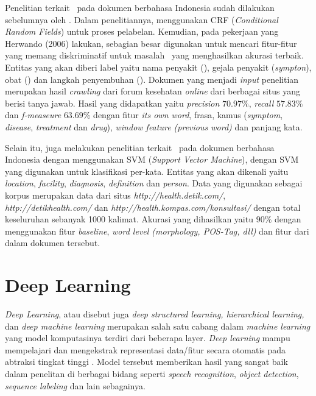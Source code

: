 Penelitian terkait \mer~pada dokumen berbahasa Indonesia sudah dilakukan sebelumnya oleh \cite{skripsiKakRadit}. Dalam penelitiannya, \cite{skripsiKakRadit} menggunakan CRF (\textit{Conditional Random Fields}) untuk proses pelabelan. Kemudian, pada pekerjaan yang Herwando (2006) lakukan, sebagian besar digunakan untuk mencari fitur-fitur yang memang diskriminatif untuk masalah \mer~yang menghasilkan akurasi terbaik. Entitas yang akan diberi label yaitu nama penyakit (\textit{\disease}), gejala penyakit (\textit{sympton}), obat (\textit{\drug}) dan langkah penyembuhan (\textit{\treatment}). Dokumen yang menjadi \textit{input} penelitian merupakan hasil \textit{crawling} dari  forum kesehatan \textit{online} dari berbagai situs yang berisi tanya jawab. Hasil yang didapatkan yaitu \textit{precision} $ 70.97\% $, \textit{recall} $ 57.83\% $ dan \textit{f-measeure} $ 63.69\% $ dengan fitur \textit{its own word}, frasa, kamus (\textit{symptom}, \textit{disease}, \textit{treatment} dan \textit{drug}), \textit{window feature (previous word)} dan panjang kata.

Selain itu, \cite{suwarningsih2014imner} juga melakukan penelitian terkait \mer~pada dokumen berbahasa Indonesia dengan menggunakan SVM (\textit{Support Vector Machine}), dengan SVM yang digunakan untuk klasifikasi per-kata. Entitas yang akan dikenali yaitu \textit{location}, \textit{facility}, \textit{diagnosis}, \textit{definition} dan \textit{person}. Data yang digunakan sebagai korpus merupakan data dari situs \textit{http://health.detik.com/}, \textit{http://detikhealth.com/} dan \textit{http://health.kompas.com/konsultasi/} dengan total keseluruhan sebanyak 1000 kalimat. Akurasi yang dihasilkan yaitu $ 90\% $ dengan menggunakan fitur \textit{baseline}, \textit{word level (morphology, POS-Tag, dll)} dan fitur dari dalam dokumen tersebut.

\section{Deep Learning}
\textit{Deep Learning}, atau disebut juga \textit{deep structured learning, hierarchical learning,} dan \textit{deep machine learning} merupakan salah satu cabang dalam \textit{machine learning} yang model komputasinya terdiri dari beberapa layer. \textit{Deep learning} mampu mempelajari dan mengekstrak representasi data/fitur secara otomatis pada abtraksi tingkat tinggi \citep{lecun2015deep}. Model tersebut memberikan hasil yang sangat baik dalam penelitan di berbagai bidang seperti \textit{speech recognition}, \textit{object detection}, \textit{sequence labeling} dan lain sebagainya.  

